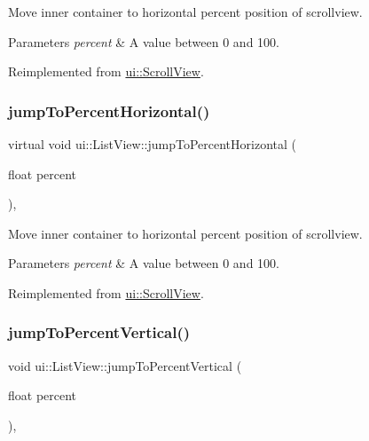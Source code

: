 Move inner container to horizontal percent position of scrollview. 
\begin{DoxyParams}{Parameters}
{\em percent} & A value between 0 and 100. \\
\hline
\end{DoxyParams}


Reimplemented from \hyperlink{classui_1_1ScrollView_ab3816071846ac5c8d4b5b4ae3c3ee5a5}{ui\+::\+Scroll\+View}.

\mbox{\label{classui_1_1ListView_a783891312300a50f3b05ff15ea3f5b19}} 
\subsubsection{\texorpdfstring{jump\+To\+Percent\+Horizontal()}{jumpToPercentHorizontal()}\hspace{0.1cm}{\footnotesize\ttfamily [2/2]}}
{\footnotesize\ttfamily virtual void ui\+::\+List\+View\+::jump\+To\+Percent\+Horizontal (\begin{DoxyParamCaption}\item[{float}]{percent }\end{DoxyParamCaption})\hspace{0.3cm}{\ttfamily [override]}, {\ttfamily [virtual]}}

Move inner container to horizontal percent position of scrollview. 
\begin{DoxyParams}{Parameters}
{\em percent} & A value between 0 and 100. \\
\hline
\end{DoxyParams}


Reimplemented from \hyperlink{classui_1_1ScrollView_ab3816071846ac5c8d4b5b4ae3c3ee5a5}{ui\+::\+Scroll\+View}.

\mbox{\label{classui_1_1ListView_a970383495e57eebfa9306c1876dbcff6}} 
\subsubsection{\texorpdfstring{jump\+To\+Percent\+Vertical()}{jumpToPercentVertical()}\hspace{0.1cm}{\footnotesize\ttfamily [1/2]}}
{\footnotesize\ttfamily void ui\+::\+List\+View\+::jump\+To\+Percent\+Vertical (\begin{DoxyParamCaption}\item[{float}]{percent }\end{DoxyParamCaption})\hspace{0.3cm}{\ttfamily [override]}, {\ttfamily [virtual]}}


